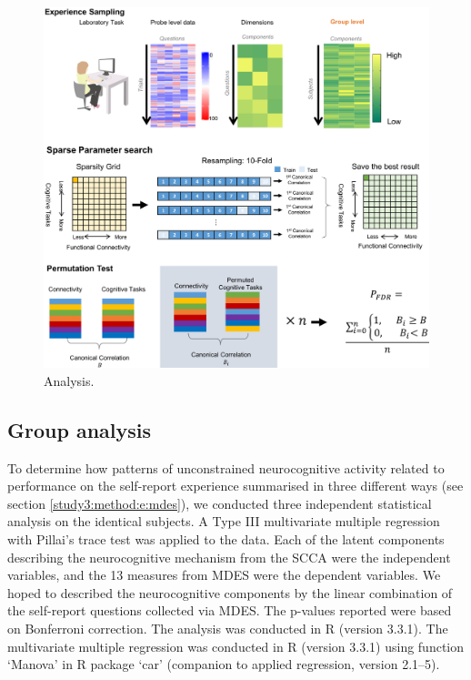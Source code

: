 \begin{figure}[H]
	\centering
	\includegraphics[width=1\textwidth]{study3/image/study3fig1.jpg}
	\caption{Analysis.}
	\label{fig:study3:fig1}
\end{figure}

\subsection{Group analysis}
\label{study3:method:g}

To determine how patterns of unconstrained neurocognitive activity related to performance on the self-report experience summarised in three different ways (see section \ref{study3:method:e:mdes}),
we conducted three independent statistical analysis on the identical subjects. A Type III multivariate multiple regression with Pillai's trace test was applied to the data. Each of the latent components describing the neurocognitive mechanism from the SCCA were the independent variables, and the 13 measures from MDES were the dependent variables. We hoped to described the neurocognitive components by the linear combination of the self-report questions collected via MDES. The p-values reported were based on Bonferroni correction. The analysis was conducted in R (version 3.3.1). The multivariate multiple regression was conducted in R (version 3.3.1) using function ‘Manova’ in R package ‘car’ (companion to applied regression, version 2.1–5).

